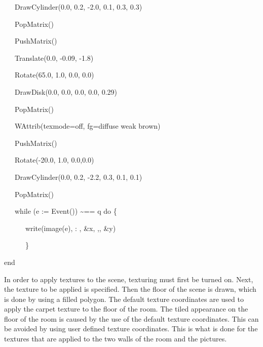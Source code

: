 \documentclass[letterpaper]{article}
\begin{document}
{{\sffamily
\ \ \ DrawCylinder(0.0, 0.2, -2.0, 0.1, 0.3, 0.3)}

{\sffamily
\ \ \ PopMatrix()}


\bigskip

{\sffamily
\ \ \ PushMatrix()}

{\sffamily
\ \ \ Translate(0.0, -0.09, -1.8)}

{\sffamily
\ \ \ Rotate(65.0, 1.0, 0.0, 0.0)}

{\sffamily
\ \ \ DrawDisk(0.0, 0.0, 0.0, 0.0, 0.29) }

{\sffamily
\ \ \ PopMatrix()}


\bigskip

{\sffamily
\ \ \ WAttrib({\textquotedbl}texmode=off{\textquotedbl}, {\textquotedbl}fg=diffuse weak brown{\textquotedbl})}

{\sffamily
\ \ \ PushMatrix()}

{\sffamily
\ \ \ Rotate(-20.0, 1.0, 0.0,0.0)}

{\sffamily
\ \ \ DrawCylinder(0.0, 0.2, -2.2, 0.3, 0.1, 0.1)}

{\sffamily
\ \ \ PopMatrix()}

{\sffamily
\ \ \ while (e := Event()) \~{}== {\textquotedbl}q{\textquotedbl} do \{}

{\sffamily
\ \ \ \ \ \ write(image(e), {\textquotedbl}: {\textquotedbl}, \&x, {\textquotedbl},{\textquotedbl}, \&y)}

{\sffamily
\ \ \ \ \ \ \}}

{\sffamily
end}


\bigskip

In order to apply textures to the scene, texturing must first be
turned on. Next, the texture to be applied is specified. Then the
floor of the scene is drawn, which is done by using a filled
polygon. The default texture coordinates are used to apply the carpet
texture to the floor of the room. The tiled appearance on the floor of
the room is caused by the use of the default texture coordinates. This
can be avoided by using user defined texture coordinates. This is what
is done for the textures that are applied to the two walls of the room
and the pictures.

}
\end{document}
